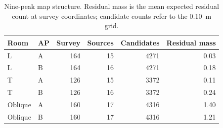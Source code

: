 \begin{table}[H]
\centering
\caption{Nine-peak map structure. Residual mass is the mean expected residual count at survey coordinates; candidate counts refer to the 0.10~m grid.}
\label{tab:maps}
\setlength{\tabcolsep}{4pt}
\begin{tabular}{llrrrr}
\toprule
Room & AP & Survey & Sources & Candidates & Residual mass\\
\midrule
L & A & 164 & 15 & 4271 & 0.03\\
L & B & 164 & 16 & 4271 & 0.18\\
T & A & 126 & 15 & 3372 & 0.11\\
T & B & 126 & 16 & 3372 & 0.24\\
Oblique & A & 160 & 17 & 4316 & 1.40\\
Oblique & B & 160 & 17 & 4316 & 1.21\\
\bottomrule
\end{tabular}
\end{table}

